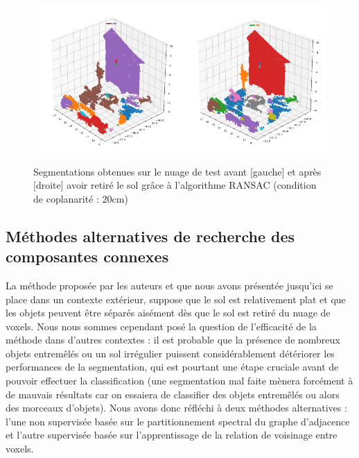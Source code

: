 \documentclass[a4paper, onecolumn, 11pt]{article}
\begin{document}
\begin{figure}[h]
    \centering
    \includegraphics[width=0.5\textwidth]{fig/first_segmentation.png}\includegraphics[width=0.5\textwidth]{fig/second_segmentation.png}
    \caption{Segmentations obtenues sur le nuage de test avant [gauche] et après [droite] avoir retiré le sol grâce à l'algorithme RANSAC (condition de coplanarité : 20cm)}
    \label{fig:first_segmentations}
\end{figure}

\subsection{Méthodes alternatives de recherche des composantes connexes}
La méthode proposée par les auteurs et que nous avons présentée jusqu'ici se place dans un contexte extérieur, suppose que le sol est relativement plat et que les objets peuvent être séparés aisément dès que le sol est retiré du nuage de voxels. Nous nous sommes cependant posé la question de l'efficacité de la méthode dans d'autres contextes : il est probable que la présence de nombreux objets entremêlés ou un sol irrégulier puissent considérablement détériorer les performances de la segmentation, qui est pourtant une étape cruciale avant de pouvoir effectuer la classification (une segmentation mal faite mènera forcément à de mauvais résultats car on essaiera de classifier des objets entremêlés ou alors des morceaux d'objets). Nous avons donc réfléchi à deux méthodes alternatives : l'une non supervisée basée sur le partitionnement spectral du graphe d'adjacence et l'autre supervisée basée sur l'apprentissage de la relation de voisinage entre voxels.
\end{document}
